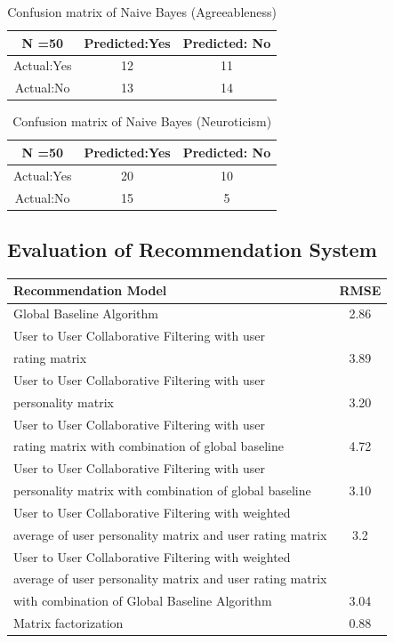 \begin{table}[!ht]
\centering
\begin{tabular}{ |c|c|c| }
 \hline
 N =50 & Predicted:Yes & Predicted: No \\
 \hline
 Actual:Yes&12 & 11 \\
 \hline
 Actual:No&13 & 14 \\
 \hline
\end{tabular}
 \caption{Confusion matrix of Naive Bayes (Agreeableness)}
\end{table}

\begin{table}[!ht]
\centering
\begin{tabular}{ |c|c|c| }
 \hline
 N =50 & Predicted:Yes & Predicted: No \\
 \hline
 Actual:Yes&20 & 10 \\
 \hline
 Actual:No&15 & 5 \\
 \hline
\end{tabular}
 \caption{Confusion matrix of Naive Bayes (Neuroticism)}
\end{table}


\subsection{Evaluation of Recommendation System}

\begin{center}
\begin{tabular}{| l | c |}
\hline
{\bf Recommendation Model} & {\bf RMSE}\\
\hline
Global Baseline Algorithm & 2.86\\
\hline
User to User Collaborative Filtering with user & \\ rating matrix & 3.89\\
\hline
User to User Collaborative Filtering with user & \\ personality matrix & 3.20\\
\hline
User to User Collaborative Filtering with user & \\ rating matrix with combination of global baseline & 4.72\\
\hline
User to User Collaborative Filtering with user & \\ personality matrix with combination of global baseline & 3.10\\
\hline
User to User Collaborative Filtering with weighted & \\ average of user personality matrix and user rating matrix & 3.2\\
\hline
User to User Collaborative Filtering with weighted & \\ average of user personality matrix and user rating matrix & \\ with combination of Global Baseline Algorithm & 3.04\\
\hline
Matrix factorization & 0.88\\
\hline
\end{tabular}
\end{center}

